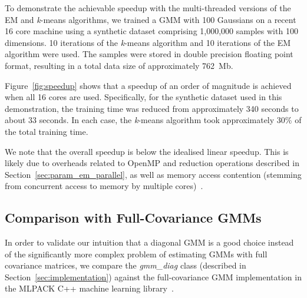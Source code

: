To demonstrate the achievable speedup with the multi-threaded versions of the EM and {\it k}-means algorithms,
we trained a GMM with 100 Gaussians on a recent 16 core machine using a synthetic dataset comprising 1,000,000 samples with 100 dimensions.
10 iterations of the {\it k}-means algorithm and 10 iterations of the EM algorithm were used.
The samples were stored in double precision floating point format, resulting in a total data size of approximately 762~Mb.

Figure~\ref{fig:speedup} shows that a speedup of an order of magnitude is achieved when all 16 cores are used.
Specifically, for the synthetic dataset used in this demonstration,
the training time was reduced from approximately 340 seconds to about 33 seconds.
In each case, the {\it k}-means algorithm took approximately 30\% of the total training time.

We note that the overall speedup is below the idealised linear speedup.
This is likely due to overheads related to OpenMP and reduction operations described in Section~\ref{sec:param_em_parallel},
as well as memory access contention (stemming from concurrent access to memory by multiple cores)~\cite{McCool_2012}.

\subsection{Comparison with Full-Covariance GMMs}


In order to validate our intuition that a diagonal GMM is a good choice instead
of the significantly more complex problem of estimating GMMs with full
covariance matrices, we compare the {\it gmm\_diag} class (described in Section~\ref{sec:implementation})
against the full-covariance GMM implementation in the MLPACK C++ machine learning library~\cite{Curtin_2013}.

